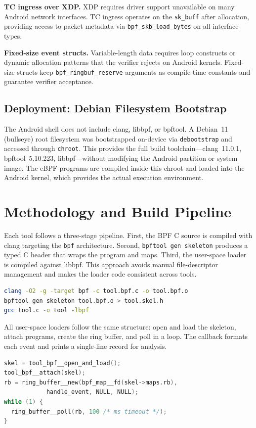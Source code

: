 \documentclass[conference]{IEEEtran}
\begin{document}
\textbf{TC ingress over XDP.} XDP requires driver support unavailable on many Android network interfaces. TC ingress operates on the \texttt{sk\_buff} after allocation, providing access to packet metadata via \texttt{bpf\_skb\_load\_bytes} on all interface types.

\textbf{Fixed-size event structs.} Variable-length data requires loop constructs or dynamic allocation patterns that the verifier rejects on Android kernels. Fixed-size structs keep \texttt{bpf\_ringbuf\_reserve} arguments as compile-time constants and guarantee verifier acceptance.

\subsection{Deployment: Debian Filesystem Bootstrap}
The Android shell does not include clang, libbpf, or bpftool. A Debian~11 (bullseye) root filesystem was bootstrapped on-device via \texttt{debootstrap} and accessed through \texttt{chroot}. This provides the full build toolchain---clang~11.0.1, bpftool~5.10.223, libbpf---without modifying the Android partition or system image. The eBPF programs are compiled inside this chroot and loaded into the Android kernel, which provides the actual execution environment.

\section{Methodology and Build Pipeline}
Each tool follows a three-stage pipeline. First, the BPF C source is compiled with clang targeting the \texttt{bpf} architecture. Second, \texttt{bpftool gen skeleton} produces a typed C header that wraps the program and maps. Third, the user-space loader is compiled against libbpf. This approach avoids manual file-descriptor management and makes the loader code consistent across tools.

\begin{lstlisting}[language=bash]
clang -O2 -g -target bpf -c tool.bpf.c -o tool.bpf.o
bpftool gen skeleton tool.bpf.o > tool.skel.h
gcc tool.c -o tool -lbpf
\end{lstlisting}

All user-space loaders follow the same structure: open and load the skeleton, attach programs, create the ring buffer, and poll in a loop. The callback formats each event and prints a single-line record for analysis.

\begin{lstlisting}[language=C]
skel = tool_bpf__open_and_load();
tool_bpf__attach(skel);
rb = ring_buffer__new(bpf_map__fd(skel->maps.rb),
            handle_event, NULL, NULL);
while (1) {
  ring_buffer__poll(rb, 100 /* ms timeout */);
}
\end{lstlisting}
\end{document}
